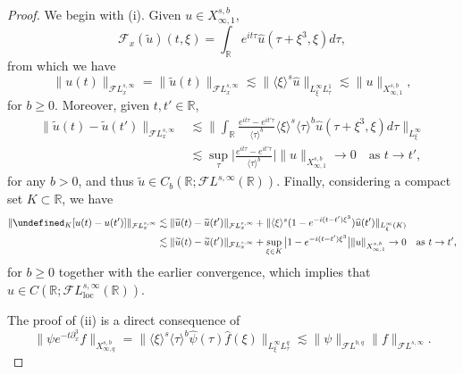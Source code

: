 \documentclass[a4paper,
11pt,  reqno]{amsart}
\newcommand{\jap}[1]{\langle #1 \rangle}
\newcommand{\5}{\textup{V}}
\newcommand{\FL}{\mathcal{F} L}
\newcommand{\ft}{\widehat}
\newcommand{\les}{\lesssim}
\newcommand{\wt}{\widetilde}
\theoremstyle{remark}
\newcommand{\R}{\mathbb{R}}
\let\P= \undefined
\newcommand{\P}{\mathbf{P}}
\newcommand{\Ft}{{\mathcal{F}}}
\newcommand{\jb}[1]
{\langle #1 \rangle}
\numberwithin{equation}{section}
\numberwithin{theorem}{section}
\begin{document}
		\begin{proof}

			We begin with (i). Given $u\in X^{s,b}_{\infty,1}$,
			$$
            \Ft_x(\wt u)(t,\xi) = \int_\R e^{it\tau}\ft{u}(\tau+\xi^3,\xi)d\tau,
			$$
            from which we have
$$\| u(t)\|_{\FL^{s,\infty}_x} = \|\wt{u}(t)\|_{\FL^{s,\infty}_x} \lesssim \|\jap{\xi}^s\ft {u}\|_{L^\infty_\xi L^1_\tau} \les \|u\|_{X^{s,b}_{\infty,1}},
			$$
            for $b\ge 0$.
			Moreover, given $t,t'\in\R$,
			\begin{align*}
				\|\wt{u}(t)-\wt{u}(t')\|_{\FL_x^{s,\infty}} &\lesssim \bigg\|\int_\R \frac{e^{it\tau}-e^{it'\tau}}{\jap{\tau}^b}\jap{\xi}^s\jap{\tau}^b\ft{u}(\tau+\xi^3,\xi)d\tau\bigg\|_{L^\infty_\xi}\\&\lesssim \sup_{\tau} \bigg| \frac{e^{it\tau}-e^{it'\tau}}{\jap{\tau}^b}\bigg| \|u\|_{X^{s,b}_{\infty,1}} \to 0 \quad \mbox{as }t\to t',
			\end{align*}
            for any $b>0$,
			and thus $\wt{u}\in C_b(\R;\FL^{s,\infty}(\R))$. Finally, considering a compact set $K\subset \R$, we have
			\begin{align*}
				\| \P_K [u(t)-u(t')]\|_{\mathcal{F}L^{s,\infty}_x}
                &
                \lesssim \|\wt{u}(t)-\wt{u}(t')\|_{\FL^{s,\infty}_x}
                + \|\jb{\xi}^s (1-e^{-i(t-t')\xi^3})\ft{u}(t')\|_{L^\infty_\xi (K) } \\
                &\lesssim \|\wt{u}(t)-\wt{u}(t')\|_{\FL^{s,\infty}_x} + \sup_{\xi\in K}\big|1 -e^{-i (t-t')\xi^3}\big| \| u \|_{X^{s,b}_{\infty,1}} \to 0\quad \mbox{as }t\to t',
			\end{align*}
            for $b\ge0$ together
            with the earlier convergence,
			which implies that $u\in C(\R;\mathcal{F}L^{s,\infty}_{\mathrm{loc}}(\R))$.


            The proof of (ii) is a direct consequence of
			$$
			\|\psi e^{-t\partial_x^3}f\|_{X^{s,b}_{\infty,q}} = \|\jap{\xi}^s\jap{\tau}^b\ft{\psi}(\tau)\ft{f}(\xi)\|_{L^\infty_\xi L^q_\tau} \lesssim \|\psi\|_{\FL^{b,q}} \|f\|_{\FL^{s,\infty}}.
			$$




			\smallskip


\end{proof}
\end{document}

